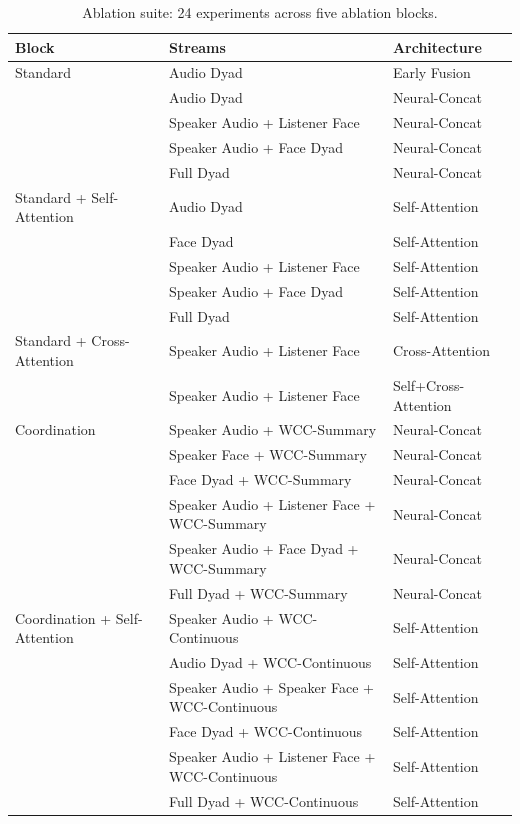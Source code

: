 \begin{table}[h]
\caption{Ablation suite: 24 experiments across five ablation blocks.}
\label{tab:ablations}
\begin{tabular}{l l l}
\toprule
Block & Streams & Architecture \\
\midrule
Standard & Audio Dyad & Early Fusion \\
 & Audio Dyad & Neural-Concat \\
 & Speaker Audio + Listener Face & Neural-Concat \\
 & Speaker Audio + Face Dyad & Neural-Concat \\
 & Full Dyad & Neural-Concat \\
\midrule
Standard + Self-Attention & Audio Dyad & Self-Attention \\
 & Face Dyad & Self-Attention \\
 & Speaker Audio + Listener Face & Self-Attention \\
 & Speaker Audio + Face Dyad & Self-Attention \\
 & Full Dyad & Self-Attention \\
\midrule
Standard + Cross-Attention & Speaker Audio + Listener Face & Cross-Attention \\
 & Speaker Audio + Listener Face & Self+Cross-Attention \\
\midrule
Coordination & Speaker Audio + WCC-Summary & Neural-Concat \\
 & Speaker Face + WCC-Summary & Neural-Concat \\
 & Face Dyad + WCC-Summary & Neural-Concat \\
 & Speaker Audio + Listener Face + WCC-Summary & Neural-Concat \\
 & Speaker Audio + Face Dyad + WCC-Summary & Neural-Concat \\
 & Full Dyad + WCC-Summary & Neural-Concat \\
\midrule
Coordination + Self-Attention & Speaker Audio + WCC-Continuous & Self-Attention \\
 & Audio Dyad + WCC-Continuous & Self-Attention \\
 & Speaker Audio + Speaker Face + WCC-Continuous & Self-Attention \\
 & Face Dyad + WCC-Continuous & Self-Attention \\
 & Speaker Audio + Listener Face + WCC-Continuous & Self-Attention \\
 & Full Dyad + WCC-Continuous & Self-Attention \\
\bottomrule
\end{tabular}
\end{table}
